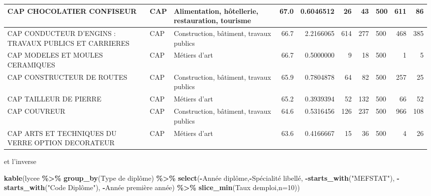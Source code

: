 \documentclass[
]{book}
\newenvironment{Shaded}{\begin{snugshade}}{\end{snugshade}}
\newcommand{\AttributeTok}[1]{\textcolor[rgb]{0.13,0.29,0.53}{#1}}
\newcommand{\DecValTok}[1]{\textcolor[rgb]{0.00,0.00,0.81}{#1}}
\newcommand{\FunctionTok}[1]{\textcolor[rgb]{0.13,0.29,0.53}{\textbf{#1}}}
\newcommand{\NormalTok}[1]{#1}
\newcommand{\SpecialCharTok}[1]{\textcolor[rgb]{0.81,0.36,0.00}{\textbf{#1}}}
\newcommand{\StringTok}[1]{\textcolor[rgb]{0.31,0.60,0.02}{#1}}
\begin{document}
\begin{tabular}{l|l|l|r|r|r|r|l|r|r}
\hline
CAP CHOCOLATIER CONFISEUR & CAP & Alimentation, hôtellerie, restauration, tourisme & 67.0 & 0.6046512 & 26 & 43 & 500 & 611 & 86\\
\hline
CAP CONDUCTEUR D'ENGINS : TRAVAUX PUBLICS ET CARRIERES & CAP & Construction, bâtiment, travaux publics & 66.7 & 2.2166065 & 614 & 277 & 500 & 468 & 385\\
\hline
CAP MODELES ET MOULES CERAMIQUES & CAP & Métiers d'art & 66.7 & 0.5000000 & 9 & 18 & 500 & 1 & 5\\
\hline
CAP CONSTRUCTEUR DE ROUTES & CAP & Construction, bâtiment, travaux publics & 65.9 & 0.7804878 & 64 & 82 & 500 & 257 & 25\\
\hline
CAP TAILLEUR DE PIERRE & CAP & Métiers d'art & 65.2 & 0.3939394 & 52 & 132 & 500 & 66 & 52\\
\hline
CAP COUVREUR & CAP & Construction, bâtiment, travaux publics & 64.6 & 0.5316456 & 126 & 237 & 500 & 966 & 108\\
\hline
CAP ARTS ET TECHNIQUES DU VERRE OPTION DECORATEUR & CAP & Métiers d'art & 63.6 & 0.4166667 & 15 & 36 & 500 & 4 & 26\\
\hline
\end{tabular}

et l'inverse

\begin{Shaded}
\begin{Highlighting}[]
\FunctionTok{kable}\NormalTok{(lycee }\SpecialCharTok{\%\textgreater{}\%} \FunctionTok{group\_by}\NormalTok{(}\StringTok{\textasciigrave{}}\AttributeTok{Type de diplôme}\StringTok{\textasciigrave{}}\NormalTok{) }\SpecialCharTok{\%\textgreater{}\%} \FunctionTok{select}\NormalTok{(}\SpecialCharTok{{-}}\StringTok{\textasciigrave{}}\AttributeTok{Année diplôme}\StringTok{\textasciigrave{}}\NormalTok{,}\SpecialCharTok{{-}}\StringTok{\textasciigrave{}}\AttributeTok{Spécialité libellé}\StringTok{\textasciigrave{}}\NormalTok{,}
                 \SpecialCharTok{{-}}\FunctionTok{starts\_with}\NormalTok{(}\StringTok{"MEFSTAT"}\NormalTok{),}
                 \SpecialCharTok{{-}}\FunctionTok{starts\_with}\NormalTok{(}\StringTok{"Code Diplôme"}\NormalTok{),}
                 \SpecialCharTok{{-}}\StringTok{\textasciigrave{}}\AttributeTok{Année première année}\StringTok{\textasciigrave{}}\NormalTok{) }\SpecialCharTok{\%\textgreater{}\%} \FunctionTok{slice\_min}\NormalTok{(}\StringTok{\textasciigrave{}}\AttributeTok{Taux d\textquotesingle{}emploi}\StringTok{\textasciigrave{}}\NormalTok{,}\AttributeTok{n=}\DecValTok{10}\NormalTok{))}
\end{Highlighting}
\end{Shaded}
\end{document}

